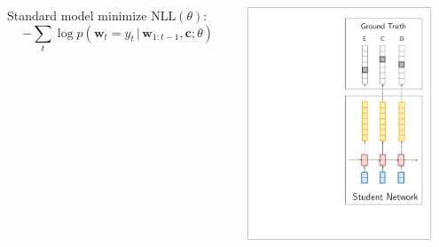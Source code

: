 \documentclass{beamer}
\newcommand{\air}{\vspace{0.25cm}}
\newcommand{\given}{\,|\,}
\newcommand{\wvec}{\mathbf{w}}
\newcommand{\cvec}{\mathbf{c}}
\begin{document}
\begin{frame}
\centerline{}
\air 


\begin{columns}
\begin{column}{6.5cm}
Standard model minimize $\text{NLL}(\theta)$: 
\air
$$-\sum_t \log p(\wvec_t=y_t \given \wvec_{1:t-1}, \cvec ; \theta)$$




\end{column}
\begin{column}{5.5cm}
\includegraphics[width=5.5cm]{word-kd-0}
\end{column}
\end{columns}
\end{frame}

\end{document}
